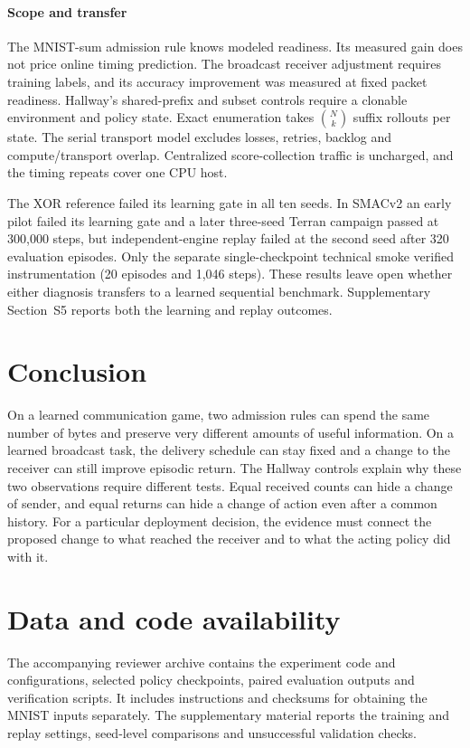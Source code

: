 \documentclass[a4paper,fleqn]{cas-dc}
\begin{document}
\paragraph{Scope and transfer}
The MNIST-sum admission rule knows modeled readiness. Its measured gain does not price online timing prediction. The broadcast receiver adjustment requires training labels, and its accuracy improvement was measured at fixed packet readiness. Hallway's shared-prefix and subset controls require a clonable environment and policy state. Exact enumeration takes $\binom{N}{k}$ suffix rollouts per state. The serial transport model excludes losses, retries, backlog and compute/transport overlap. Centralized score-collection traffic is uncharged, and the timing repeats cover one CPU host.

The XOR reference failed its learning gate in all ten seeds. In SMACv2 an early pilot failed its learning gate and a later three-seed Terran campaign passed at 300,000 steps, but independent-engine replay failed at the second seed after 320 evaluation episodes. Only the separate single-checkpoint technical smoke verified instrumentation (20 episodes and 1,046 steps). These results leave open whether either diagnosis transfers to a learned sequential benchmark. Supplementary Section~S5 reports both the learning and replay outcomes.
\section{Conclusion}
On a learned communication game, two admission rules can spend the same number of bytes and preserve very different amounts of useful information. On a learned broadcast task, the delivery schedule can stay fixed and a change to the receiver can still improve episodic return. The Hallway controls explain why these two observations require different tests. Equal received counts can hide a change of sender, and equal returns can hide a change of action even after a common history. For a particular deployment decision, the evidence must connect the proposed change to what reached the receiver and to what the acting policy did with it.

\section*{Data and code availability}
The accompanying reviewer archive contains the experiment code and configurations, selected policy checkpoints, paired evaluation outputs and verification scripts. It includes instructions and checksums for obtaining the MNIST inputs separately. The supplementary material reports the training and replay settings, seed-level comparisons and unsuccessful validation checks.

\FloatBarrier

\end{document}
